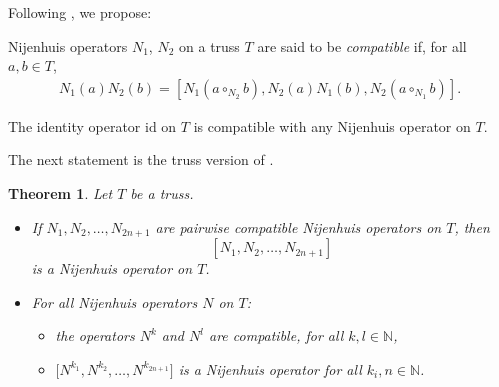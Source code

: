 \documentclass[10pt,a4paper]{amsart}
\numberwithin{equation}{section}
\newtheorem{Theorem}{Theorem}[section]
\newcommand{\N}{\mathbb N}
\newcommand{\id}{\mathrm{id}}
\begin{document}
Following \cite{4}, we propose:
\begin{Definition}\label{def.compat}
 Nijenhuis operators $N_1$, $N_2$ on a truss $T$ are said to be \textit{compatible} if, for all $a,b\in T$,
 \begin{gather*}%
 N_1(a)N_2(b) = [ N_1(a\circ_{N_2}b),N_2(a)N_1(b), N_2(a\circ_{N_1}b) ].
 \end{gather*}
\end{Definition}
\begin{Example}\label{ex.com.id}
 The identity operator $\id$ on $T$ is compatible with any Nijenhuis operator on $T$.
\end{Example}
The next statement is the truss version of \cite[Theorems~3 and~4]{4}.
\begin{Theorem}\label{thm.comp}
 Let $T$ be a truss.
 \begin{itemize}\itemsep=0pt
 \item[$(1)$] If $N_1, N_2,\dots,N_{2n+1}$ are pairwise compatible Nijenhuis operators on $T$, then
 \[
 [N_1,N_2,\dots, N_{2n+1}]
 \]
 is a Nijenhuis operator on $T$.
 \item[$(2)$] For all Nijenhuis operators $N$ on $T$:
 \begin{itemize}\itemsep=0pt
 \item[$(a)$] the operators $N^k$ and $N^l$ are compatible, for all $k,l\in \N$,
 \item[$(b)$] $\big[N^{k_1},N^{k_2},\dots, N^{k_{2n+1}}\big]$ is a Nijenhuis operator for all $k_i,n\in \N$.
 \end{itemize}
 \end{itemize}
\end{Theorem}
\end{document}
